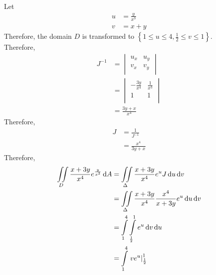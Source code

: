 \documentclass[fleqn, a4paper, 12pt, twoside]{article}
\theoremstyle{definition}
\theoremstyle{theorem}
\begin{document}
\begin{solution}
\begin{figure}[H]
	\end{figure}
	Let
	\begin{align*}
		u & = \frac{y}{x^3} \\
		v & = x + y
	\end{align*}
	Therefore, the domain $D$ is transformed to $\left\{ 1 \le u \le 4 , \frac{1}{2} \le v \le 1 \right\}$.\\
	Therefore,
	\begin{align*}
		J^{-1} &=
			\begin{vmatrix}
				u_x & u_y \\
				v_x & v_y \\
			\end{vmatrix}\\
		       &=
			\begin{vmatrix}
				-\frac{3 y}{x^4} & \frac{1}{x^3} \\
				1                & 1             \\
			\end{vmatrix}\\
		       &= \frac{3 y + x}{x^4}
	\end{align*}
	Therefore,
	\begin{align*}
		J & = \frac{1}{J^{-1}} \\
                  & = \frac{x^4}{3 y + x}
	\end{align*}
	Therefore,
	\begin{align*}
		\iint\limits_{D} \frac{x + 3 y}{x^4} e^{\frac{y}{x^3}} \dif A & = \iint\limits_{\Delta} \frac{x + 3 y}{x^4} e^u J \dif u \dif v                   \\
                                                                              & = \iint\limits_{\Delta} \frac{x + 3 y}{x^4} \frac{x^4}{x + 3 y} e^u \dif u \dif v \\
                                                                              & = \int\limits_{1}^{4} \int\limits_{\frac{1}{2}}^{1} e^u \dif v \dif u             \\
                                                                              & = \int\limits_{1}^{4} \left. v e^u \right|_{\frac{1}{2}}^{1}                      \\

\end{align*}
\end{solution}
\end{document}

